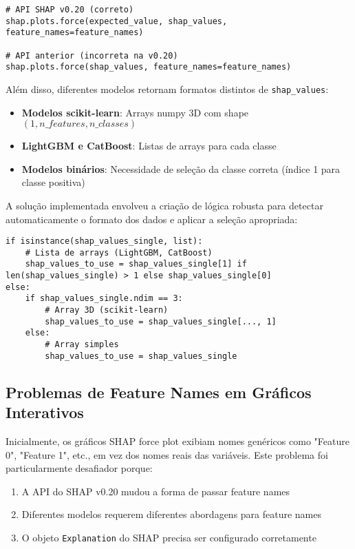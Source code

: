 \begin{verbatim}
# API SHAP v0.20 (correto)
shap.plots.force(expected_value, shap_values, feature_names=feature_names)

# API anterior (incorreta na v0.20)
shap.plots.force(shap_values, feature_names=feature_names)
\end{verbatim}

Além disso, diferentes modelos retornam formatos distintos de \texttt{shap\_values}:
\begin{itemize}
    \item \textbf{Modelos scikit-learn}: Arrays numpy 3D com shape $(1, n\_features, n\_classes)$
    \item \textbf{LightGBM e CatBoost}: Listas de arrays para cada classe
    \item \textbf{Modelos binários}: Necessidade de seleção da classe correta (índice 1 para classe positiva)
\end{itemize}

A solução implementada envolveu a criação de lógica robusta para detectar automaticamente o formato dos dados e aplicar a seleção apropriada:

\begin{verbatim}
if isinstance(shap_values_single, list):
    # Lista de arrays (LightGBM, CatBoost)
    shap_values_to_use = shap_values_single[1] if len(shap_values_single) > 1 else shap_values_single[0]
else:
    if shap_values_single.ndim == 3:
        # Array 3D (scikit-learn)
        shap_values_to_use = shap_values_single[..., 1]
    else:
        # Array simples
        shap_values_to_use = shap_values_single
\end{verbatim}

\subsection*{Problemas de Feature Names em Gráficos Interativos}

Inicialmente, os gráficos SHAP force plot exibiam nomes genéricos como "Feature 0", "Feature 1", etc., em vez dos nomes reais das variáveis. Este problema foi particularmente desafiador porque:

\begin{enumerate}
    \item A API do SHAP v0.20 mudou a forma de passar feature names
    \item Diferentes modelos requerem diferentes abordagens para feature names
    \item O objeto \texttt{Explanation} do SHAP precisa ser configurado corretamente
\end{enumerate}

